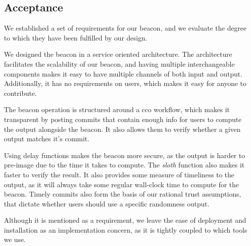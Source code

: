 \subsection{Acceptance}
We established a set of requirements for our beacon, and we evaluate the degree to which they have been fulfilled by our design.






We designed the beacon in a service oriented architecture. The architecture facilitates the scalability of our beacon, and having multiple interchangeable components makes it easy to have multiple channels of both input and output. Additionally, it has no requirements on users, which makes it easy for anyone to contribute.

The beacon operation is structured around a \acrshort{cco} workflow, which makes it transparent by posting commits that contain enough info for users to compute the output alongside the beacon. It also allows them to verify whether a given output matches it's commit.

Using delay functions makes the beacon more secure, as the output is harder to pre-image due to the time it takes to compute. The \emph{sloth} function also makes it faster to verify the result. It also provides some measure of timeliness to the output, as it will always take some regular wall-clock time to compute for the beacon. Timely commits also form the basis of our rational trust assumptions, that dictate whether users should use a specific randomness output.

Although it is mentioned as a requirement, we leave the ease of deployment and installation as an implementation concern, as it is tightly coupled to which tools we use.



